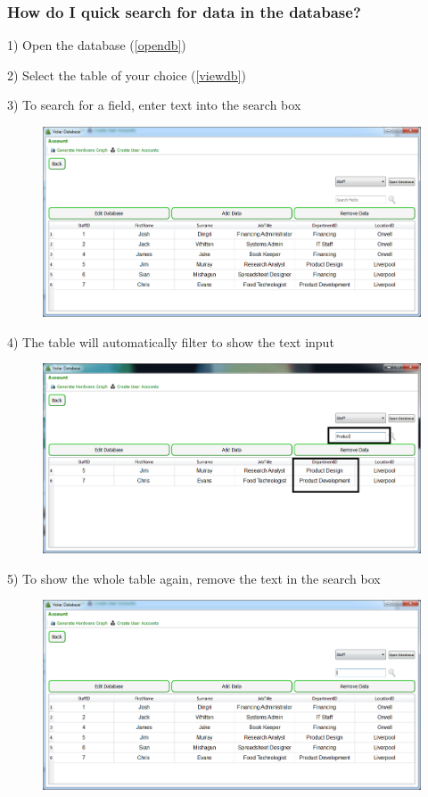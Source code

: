 \subsubsection{How do I quick search for data in the database?}

1) Open the database (\ref{opendb})

2) Select the table of your choice (\ref{viewdb})

3) To search for a field, enter text into the search box 

\begin{figure}[H]
    \includegraphics[width=\textwidth]{./Manual/Images/search1.png}
\end{figure}

4) The table will automatically filter to show the text input

\begin{figure}[H]
    \includegraphics[width=\textwidth]{./Manual/Images/search.png}
\end{figure}

5) To show the whole table again, remove the text in the search box

\begin{figure}[H]
    \includegraphics[width=\textwidth]{./Manual/Images/search2.png}
\end{figure}


